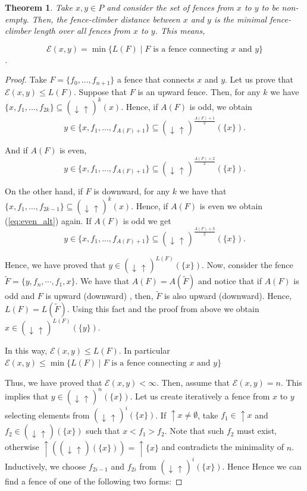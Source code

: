 \documentclass{article}[12pt]
\theoremstyle{exampstyle}
\newtheorem{theorem}{Theorem}[section]
\theoremstyle{remark}
\newcommand{\E}{\mathcal{E}}
\newcommand{\updown}[1][]{\downarrow_{#1} \uparrow_{#1}}
\newcommand{\tuple}[3][1]{#2_{#1}, \dots , #2_{#3}}
\begin{document}
\begin{theorem}
   Take $x,y \in P$ and consider the set of fences from $x$ to $y$ to be non-empty. Then, the fence-climber distance between $x$ and $y$ is the minimal fence-climber length over all fences from $x$ to $y$. This means, 
        
    \[\E(x,y)  = \min \{ L(F) \mid F \text { is a fence connecting } x \text{ and } y\} \]. 
    \label{th_E_is_metric}
\end{theorem}   
\begin{proof}
     Take $F = \{\tuple[0]{f}{n+1}\}$ a fence that connects $x$ and $y$. Let us prove that $\E(x,y) \leq L(F)$. Suppose that $F$ is an upward fence. Then, for any $k$  we have  $\{ x,f_1,...,f_{2k} \} \subseteq (\updown)^k(x) $. Hence, if $A(F)$ is odd, we obtain 
    \begin{equation*}
         y \in \{ x, f_1, ..., f_{A(F) + 1} \} \subseteq (\updown)^{\frac{A(F) +1}{2}}(\{x\}). 
    \end{equation*}
       
    And if $A(F)$ is even,
    \begin{equation}
         y \in \{ x, f_1, ..., f_{A(F) + 1} \} \subseteq (\updown)^{\frac{A(F) + 2}{2}}(\{x\}).
         \label{eq:even_alt}
    \end{equation}
       
    On the other hand, if $F$ is downward, for any $k$ we have that $\{ x,f_1, ... , f_{2k-1} \} \subseteq (\updown)^k(x)$. Hence, if  $A(F)$ is even we obtain (\ref{eq:even_alt}) again. If $A(F)$ is odd we get 
    \begin{equation*}
          y \in \{ x, f_1, ..., f_{A(F) + 1} \} \subseteq (\updown)^{\frac{A(F) +3}{2}}(\{x\}).
    \end{equation*}

    Hence, we have proved that $y \in (\updown)^{L(F)}(\{x\})$. Now, consider the fence $\tilde{F} = \{y , f_{n}, \cdots, f_1 , x \}$. We have that $A(F) =  A (\tilde{F}) $ and notice that if $A(F)$ is odd and $F$ is upward (downward) , then, $\tilde{F}$ is also upward (downward).  Hence, $L(F) = L(\tilde{F})$. Using this fact and the proof from above we obtain $x \in (\updown)^{L(F)}(\{y\})$.  
    
    In this way, $\E(x,y) \leq L(F)$. In particular $\E(x,y) \leq \min \{ L(F) \mid F \text { is a fence connecting } x \text{ and } y\}$

   Thus, we have proved that $\E(x,y) < \infty $. Then, assume that $\E(x,y) = n $. This implies that $y \in (\updown)^n(\{x\})$. Let us create iteratively a fence from $x$ to $y$ selecting elements from $(\updown)^i(\{x\})$. If $\uparrow x \neq \emptyset$, take $f_1 \in \uparrow x$ and $f_2 \in (\updown)(\{x\})$ such that $x < f_1 > f_2$. Note that such $f_2$ must exist, otherwise $\uparrow ((\updown)(\{x\})) = \uparrow \{x\}$ and contradicts the minimality of $n$. Inductively, we choose $f_{2i-1}$ and $f_{2i}$ from $(\updown)^i(\{x\})$. Hence Hence we can find a fence of one of the following two forms:
   

\end{proof}
\end{document}
